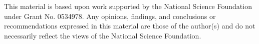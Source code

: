 \vspace{6.5in}

\begin{singlespace}
This material is based upon work supported by the National Science Foundation 
under Grant No. 0534978. Any opinions, findings, and conclusions or 
recommendations expressed in this material are those of the author(s) and do 
not necessarily reflect the views of the National Science Foundation.
\end{singlespace}

